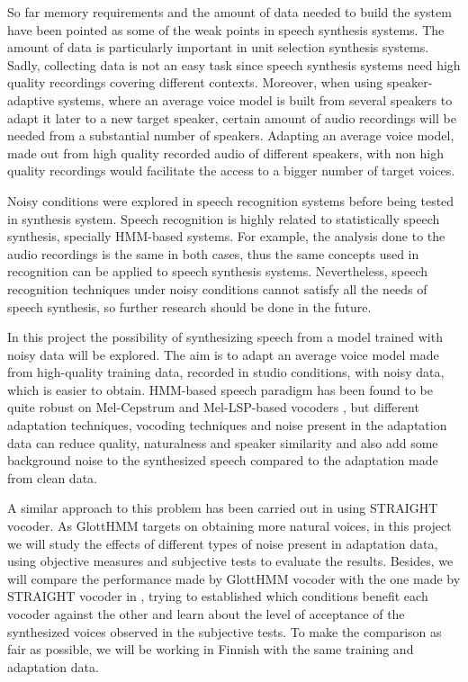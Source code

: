 So far memory requirements and the amount of data needed to build the system have been pointed as some of the weak points in speech synthesis systems. The amount of data is particularly important in unit selection synthesis systems. Sadly, collecting data is not an easy task since speech synthesis systems need high quality recordings covering different contexts. Moreover, when using speaker-adaptive systems, where an average voice model is built from several speakers to adapt it later to a new target speaker, certain amount of audio recordings will be needed from a substantial number of speakers. Adapting an average voice model, made out from high quality recorded audio of different speakers, with non high quality recordings would facilitate the access to a bigger number of target voices.

Noisy conditions were explored in speech recognition systems before being tested in synthesis system. Speech recognition is highly related to statistically speech synthesis, specially HMM-based systems. For example, the analysis done to the audio recordings is the same in both cases, thus the same concepts used in recognition can be applied to speech synthesis systems. Nevertheless, speech recognition techniques under noisy conditions cannot satisfy all the needs of speech synthesis, so further research should be done in the future.

In this project the possibility of synthesizing speech from a model trained with noisy data will be explored. The aim is to adapt an average voice model made from high-quality training data, recorded in studio conditions, with noisy data, which is easier to obtain. HMM-based speech paradigm has been found to be quite robust on Mel-Cepstrum \cite{karhila_jstsp_14, yamagishi2008robustness} and Mel-LSP-based vocoders \cite{Yanagisawa_SSW8}, but different adaptation techniques, vocoding techniques and noise present in the adaptation data can reduce quality, naturalness and speaker similarity and also add some background noise to the synthesized speech compared to the adaptation made from clean data. 

A similar approach to this problem has been carried out in \cite{karhila_jstsp_14} using STRAIGHT vocoder. As GlottHMM targets on obtaining more natural voices, in this project we will study the effects of different types of noise present in adaptation data, using objective measures and subjective tests to evaluate the results. Besides, we will compare the performance made by GlottHMM vocoder with the one made by STRAIGHT vocoder in \cite{karhila_jstsp_14}, trying to established which conditions benefit each vocoder against the other and learn about the level of acceptance of the synthesized voices observed in the subjective tests. To make the comparison as fair as possible, we will be working in Finnish with the same training and adaptation data.
